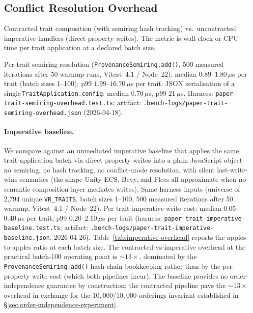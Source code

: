 \documentclass[sigconf,nonacm]{acmart}
\begin{document}
\subsection{Conflict Resolution Overhead}

Contracted trait composition (with semiring hash tracking)
vs.\ uncontracted imperative handlers (direct property
writes). The metric is wall-clock or CPU time per trait
application at a declared batch size.

Per-trait semiring resolution (\texttt{ProvenanceSemiring.add()}, 500 measured iterations after 50 warmup runs, Vitest~4.1 / Node~22):
median $0.89$--$1.80\,\mu$s per trait (batch sizes 1--100); p99 $1.99$--$16.70\,\mu$s per trait.
JSON serialisation of a single\,\texttt{TraitApplication.config}: median $0.70\,\mu$s, p99 $21\,\mu$s.
Harness: \texttt{paper-trait-semiring-overhead.test.ts};
artifact: \texttt{.bench-logs/paper-trait-semiring-overhead.json} (2026-04-18).

\paragraph{Imperative baseline.}
We compare against an unmediated imperative baseline that applies the same
trait-application batch via direct property writes into a plain JavaScript
object---no semiring, no hash tracking, no conflict-mode resolution, with
silent last-write-wins semantics (the shape Unity ECS, Bevy, and Flecs all
approximate when no semantic composition layer mediates writes).
Same harness inputs (universe of 2{,}794 unique \texttt{VR\_TRAITS},
batch sizes 1--100, 500 measured iterations after 50 warmup, Vitest~4.1 /
Node~22). Per-trait imperative-write cost: median
$0.05$--$0.40\,\mu$s per trait; p99 $0.20$--$2.10\,\mu$s per trait
(harness: \texttt{paper-trait-imperative-baseline.test.ts}; artifact:
\texttt{.bench-logs/paper-trait-imperative-baseline.json}, 2026-04-26).
Table~\ref{tab:imperative-overhead} reports the apples-to-apples ratio at
each batch size. The contracted-vs-imperative overhead at the practical
batch-100 operating point is $\sim\!13\times$, dominated by the
\texttt{ProvenanceSemiring.add()} hash-chain bookkeeping rather than by
the per-property write cost (which both pipelines incur). The baseline
provides no order-independence guarantee by construction; the contracted
pipeline pays the $\sim\!13\times$ overhead in exchange for the
$10{,}000$/$10{,}000$ orderings invariant established in
\S\ref{sec:order-independence-experiment}.
\end{document}
